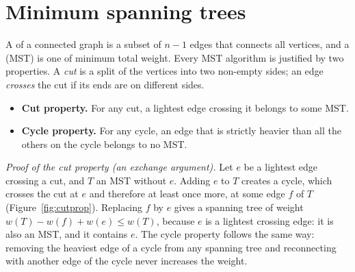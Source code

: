 \section[Minimum spanning trees]{Minimum spanning trees \hfill \gold}\label{sec:mst}

A  of a connected graph is a subset of $n - 1$ edges that connects all vertices, and a  (MST) is one of minimum total weight. Every MST algorithm is justified by two properties. A \emph{cut} is a
split of the vertices into two non-empty sides; an edge \emph{crosses} the cut if its ends are on different sides.

\begin{itemize}
  \item \textbf{Cut property.} For any cut, a lightest edge crossing it belongs to some MST.
  \item \textbf{Cycle property.} For any cycle, an edge that is strictly heavier than all the others on the cycle belongs to no
        MST.
\end{itemize}

\emph{Proof of the cut property (an exchange argument).} Let $e$ be a lightest edge crossing a cut, and $T$ an MST without $e$.
Adding $e$ to $T$ creates a cycle, which crosses the cut at $e$ and therefore at least once more, at some edge $f$ of $T$
(Figure~\ref{fig:cutprop}). Replacing $f$ by $e$ gives a spanning tree of weight $w(T) - w(f) + w(e) \le w(T)$, because $e$ is a
lightest crossing edge: it is also an MST, and it contains $e$. The cycle property follows the same way: removing the heaviest
edge of a cycle from any spanning tree and reconnecting with another edge of the cycle never increases the weight.

